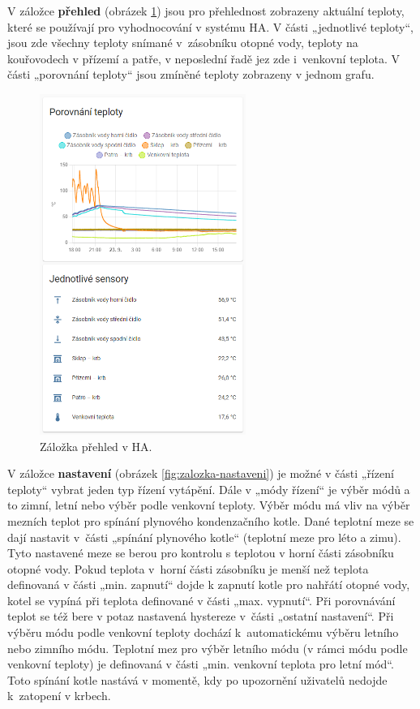 V záložce \textbf{přehled} (obrázek \ref{fig:zalozka-prehled}) jsou pro přehlednost zobrazeny aktuální teploty, které se používají pro vyhodnocování v systému HA. V části „jednotlivé teploty“, jsou zde všechny teploty snímané v~zásobníku otopné vody, teploty na kouřovodech v přízemí a patře, v neposlední řadě jez zde i~venkovní teplota. V části „porovnání teploty“ jsou zmíněné teploty zobrazeny v jednom grafu.

\begin{figure}[H]
    \centering
    \includegraphics[width=0.6\textwidth]{images/software-ha/zalozka-prehled.png}
    \caption{Záložka přehled v HA.}
    \label{fig:zalozka-prehled}
\end{figure}

V záložce \textbf{nastavení} (obrázek \ref{fig:zalozka-nastaveni}) je možné v části „řízení teploty“ vybrat jeden typ řízení vytápění. Dále v „módy řízení“ je výběr módů a to zimní, letní nebo výběr podle venkovní teploty. Výběr módu má vliv na výběr mezních teplot pro spínání plynového kondenzačního kotle. Dané teplotní meze se dají nastavit v~části „spínání plynového kotle“ (teplotní meze pro léto a zimu). Tyto nastavené meze se berou pro kontrolu s teplotou v horní části zásobníku otopné vody. Pokud teplota v~horní části zásobníku je menší než teplota definovaná v části „min. zapnutí“ dojde k zapnutí kotle pro nahřátí otopné vody, kotel se vypíná při teplota definované v části „max. vypnutí“. Při porovnávání teplot se též bere v potaz nastavená hystereze v~části „ostatní nastavení“. Při výběru módu podle venkovní teploty dochází k~automatickému výběru letního nebo zimního módu. Teplotní mez pro výběr letního módu (v rámci módu podle venkovní teploty) je definovaná v části „min. venkovní teplota pro letní mód“. Toto spínání kotle nastává v momentě, kdy po upozornění uživatelů nedojde k~zatopení v krbech.


